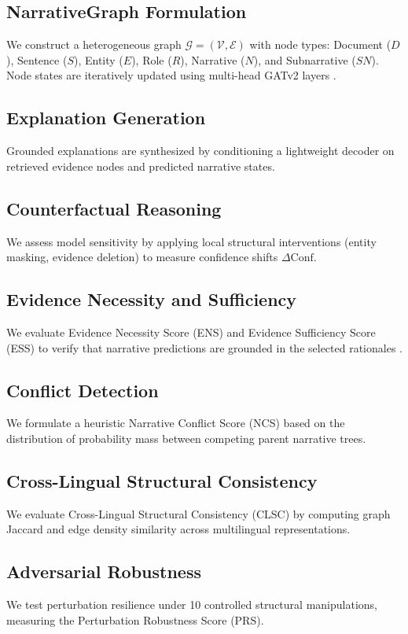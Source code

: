 \documentclass[11pt,a4paper]{article}
\begin{document}
\subsection{NarrativeGraph Formulation}
We construct a heterogeneous graph $\mathcal{G}=(\mathcal{V}, \mathcal{E})$ with node types: Document ($D$), Sentence ($S$), Entity ($E$), Role ($R$), Narrative ($N$), and Subnarrative ($SN$). Node states are iteratively updated using multi-head GATv2 layers \citep{brody2022attentive}.

\subsection{Explanation Generation}
Grounded explanations are synthesized by conditioning a lightweight decoder on retrieved evidence nodes and predicted narrative states.

\subsection{Counterfactual Reasoning}
We assess model sensitivity by applying local structural interventions (entity masking, evidence deletion) to measure confidence shifts $\Delta \text{Conf}$.

\subsection{Evidence Necessity and Sufficiency}
We evaluate Evidence Necessity Score (ENS) and Evidence Sufficiency Score (ESS) to verify that narrative predictions are grounded in the selected rationales \citep{deyoung2020eraser}.

\subsection{Conflict Detection}
We formulate a heuristic Narrative Conflict Score (NCS) based on the distribution of probability mass between competing parent narrative trees.

\subsection{Cross-Lingual Structural Consistency}
We evaluate Cross-Lingual Structural Consistency (CLSC) by computing graph Jaccard and edge density similarity across multilingual representations.

\subsection{Adversarial Robustness}
We test perturbation resilience under 10 controlled structural manipulations, measuring the Perturbation Robustness Score (PRS).
\end{document}
